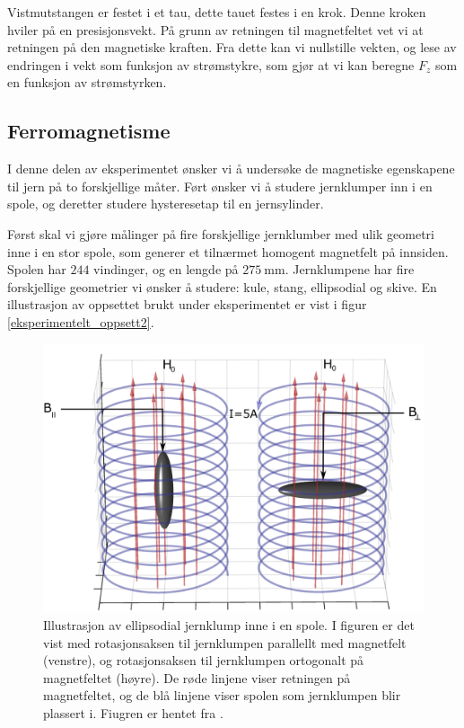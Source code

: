 \documentclass[%
 reprint,
 amsmath,amssymb,
 aps,
]{revtex4-1}
\begin{document}
Vistmutstangen er festet i et tau, dette tauet festes i en krok. Denne kroken hviler på en presisjonsvekt. På grunn av retningen til magnetfeltet vet vi at retningen på den magnetiske kraften. Fra dette kan vi nullstille vekten, og lese av endringen i vekt som funksjon av strømstykre, som gjør at vi kan beregne $F_z$ som en funksjon av strømstyrken.
\subsection{Ferromagnetisme}
I denne delen av eksperimentet ønsker vi å undersøke de magnetiske egenskapene til jern på to forskjellige måter. Ført ønsker vi å studere jernklumper inn i en spole, og deretter studere hysteresetap til en jernsylinder. \par
Først skal vi gjøre målinger på fire forskjellige jernklumber med ulik geometri inne i en stor spole, som generer et tilnærmet homogent magnetfelt på innsiden. Spolen har $244$ vindinger, og en lengde på $\SI{275}{\milli\meter}$. Jernklumpene har fire forskjellige geometrier vi ønsker å studere: kule, stang, ellipsodial og skive. En illustrasjon av oppsettet brukt under eksperimentet er vist i figur \vref{eksperimentelt_oppsett2}.
\begin{figure}[h!]
  \centering
  \includegraphics[scale=0.3]{oppsett2.png}
  \caption{Illustrasjon av ellipsodial jernklump inne i en spole. I figuren er det vist med rotasjonsaksen til jernklumpen parallellt med magnetfelt (venstre), og rotasjonsaksen til jernklumpen ortogonalt på magnetfeltet (høyre). De røde linjene viser retningen på magnetfeltet, og de blå linjene viser spolen som jernklumpen blir plassert i. Fiugren er hentet fra \cite{oppgave}.}
  \label{eksperimentelt_oppsett2}
\end{figure}
\end{document}
